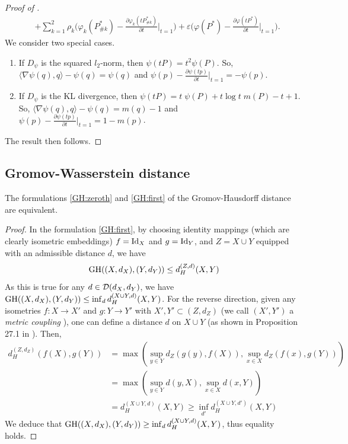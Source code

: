 \begin{proof}[Proof of ]
\begin{align}
  &+ \sum_{k=1}^2
  \rho_k \Bigg( \varphi_k(P^*_{\# k}) - \frac{\partial \varphi_k(tP^*_{\# k})}{\partial t} \bigg|_{t=1} \Bigg)
  + \varepsilon \Bigg( \varphi(P^*) - \frac{\partial \varphi(tP^*)}{\partial t} \bigg|_{t=1} \Bigg).
\end{align}
We consider two special cases.
\begin{enumerate}
  \item If $D_{\psi}$ is the squared $l_2$-norm, then $\psi(tP) = t^2 \psi(P)$. So,
  $\langle \nabla \psi(q), q \rangle - \psi(q) = \psi(q)$ and
  $\psi(p) - \frac{\partial \psi(tp)}{\partial t} \Big|_{t=1} = -\psi(p)$.

  \item If $D_{\psi}$ is the KL divergence, then
  $\psi(tP) = t \; \psi(P) + t \log t \; m(P) - t + 1$.
  So, $\langle \nabla \psi(q), q \rangle - \psi(q) = m(q) - 1$ and
  $\psi(p) - \frac{\partial \psi(tp)}{\partial t} \Big|_{t=1} = 1 - m(p)$.
\end{enumerate}
The result then follows.
\end{proof}

\subsection{Gromov-Wasserstein distance}

\begin{corollary}
    The formulations \eqref{GH:zeroth} and \eqref{GH:first} of the Gromov-Hausdorff distance
    are equivalent.
\end{corollary}
\begin{proof}
In the formulation \eqref{GH:first}, by choosing identity mappings (which are clearly isometric embeddings)
$f = \text{Id}_X$ and $g = \text{Id}_Y$, and $Z = X \cup Y$ equipped with an admissible distance $d$, we have
\begin{equation}
  \text{GH}((X,d_X), (Y,d_Y)) \leq d_{H}^{(Z,d)}(X, Y)
\end{equation}
As this is true for any $d \in \mathcal D(d_X,d_Y)$, we have
$\text{GH}((X,d_X), (Y,d_Y)) \leq \inf_{d} d_{H}^{(X \cup Y, d)}(X, Y)$. For the reverse direction,
given any isometries $f: X \to X'$ and $g: Y \to Y'$ with $X', Y' \subset (Z, d_Z)$
(we call $(X',Y')$ a \textit{metric coupling} \citep{Villani08}), one can define
a distance $d$ on $X \cup Y$ (as shown in Proposition 27.1 in \citep{Villani08}). Then,
\begin{equation}
  \begin{split}
    d_H^{(Z, d_Z)}(f(X), g(Y)) &=
  \max(\sup_{y \in Y} d_Z(g(y), f(X)), \sup_{x \in X} d_Z(f(x), g(Y))) \\
  &= \max(\sup_{y \in Y} d(y, X), \sup_{x \in X} d(x, Y)) \\
  &= d_H^{(X \cup Y, d)}(X, Y) \geq \inf_{d'} d_{H}^{(X \cup Y, d')}(X, Y)
  \end{split}
\end{equation}
We deduce that $\text{GH}((X,d_X), (Y,d_Y)) \geq \inf_{d} d_{H}^{(X \cup Y, d)}(X, Y)$,
thus equality holds.
\end{proof}

